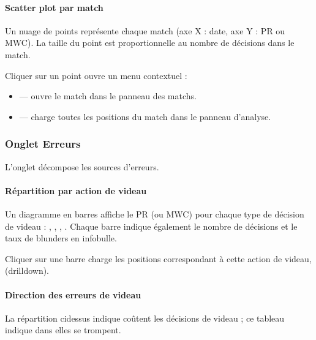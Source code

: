 \documentclass[letterpaper,10pt,french]{sphinxmanual}
\begin{document}
\paragraph{Scatter plot par match}
\label{\detokenize{manuel:scatter-plot-par-match}}
\sphinxAtStartPar
Un nuage de points représente chaque match (axe X : date, axe Y : PR ou MWC).
La taille du point est proportionnelle au nombre de décisions dans le match.

\sphinxAtStartPar
Cliquer sur un point ouvre un menu contextuel :
\begin{itemize}
\item {} 
\sphinxAtStartPar
{} — ouvre le match dans le panneau des matchs.

\item {} 
\sphinxAtStartPar
{} — charge toutes les positions du match dans le panneau
d’analyse.

\end{itemize}


\subsubsection{Onglet Erreurs}
\label{\detokenize{manuel:onglet-erreurs}}
\sphinxAtStartPar
L’onglet  décompose les sources d’erreurs.


\paragraph{Répartition par action de videau}
\label{\detokenize{manuel:repartition-par-action-de-videau}}
\sphinxAtStartPar
Un diagramme en barres affiche le PR (ou MWC) pour chaque type de décision
de videau : , , , . Chaque barre
indique également le nombre de décisions et le taux de blunders en infobulle.

\sphinxAtStartPar
Cliquer sur une barre charge les positions correspondant à cette action de
videau,  (drill\sphinxhyphen{}down).


\paragraph{Direction des erreurs de videau}
\label{\detokenize{manuel:direction-des-erreurs-de-videau}}
\sphinxAtStartPar
La répartition ci\sphinxhyphen{}dessus indique  coûtent les décisions de videau ;
ce tableau indique dans  elles se trompent.
\end{document}
